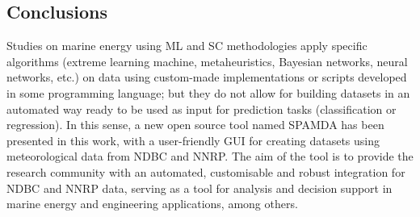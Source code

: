 \documentclass[energies,article,accept,moreauthors,pdftex]{Definitions/mdpi}
\begin{document}
\begin{paracol}{2}
	\section{Conclusions}\label{sec:Conclusions}

		
		
{Studies on marine energy using ML and SC methodologies apply specific algorithms (extreme learning machine, metaheuristics, Bayesian networks, neural networks, etc.) on data using custom-made implementations or scripts developed in some programming language; but they do not allow for building datasets in an automated way ready to be used as input for prediction tasks (classification or regression). In this sense, a new open source tool named SPAMDA has been presented in this work, with a user-friendly GUI for creating datasets using meteorological data from NDBC and NNRP. The aim of the tool is to provide the research community with an automated, customisable and robust integration for NDBC and NNRP data, serving as a tool for analysis and decision support in marine energy and engineering applications, among others.}
		

\end{paracol}
\end{document}
